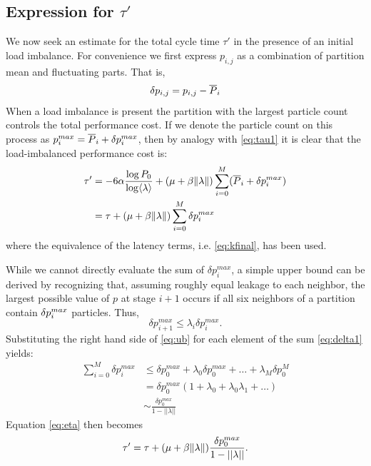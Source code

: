 \subsection{Expression for $\tau'$}

We now seek an estimate for the total cycle time $\tau'$ in the presence of an
initial load imbalance.  For convenience we first express $p_{i,j}$ as a
combination of partition mean and fluctuating parts. That is,
\begin{equation}
  \label{eq:mean}
  \delta{p_{i,j}} = p_{i,j} - \overline{P}_i
\end{equation}
When a load imbalance is present the partition with the largest particle count
controls the total performance cost.  If we denote the particle count on this
process as $p^{max}_i = \overline{P}_i + \delta{p_i^{max}}$, then by analogy with
\eqref{eq:tau1} it is clear that the load-imbalanced performance cost is:
\begin{align}
  \label{eq:eta}
  \tau' &= -6 \alpha \frac{\log P_0}{\log \langle \lambda \rangle} + (\mu + \beta \| \lambda \|)
  \sum_{i=0}^{M} (\overline{P}_i + \delta{p_i^{max}}) \\
  &= \tau + (\mu + \beta \| \lambda \|) \sum_{i=0}^{M}\delta{p_i^{max}}
\end{align}
where the equivalence of the latency terms, i.e. \eqref{eq:kfinal}, has been
used.

While we cannot directly evaluate the sum of $\delta p_i^{max}$, a simple upper
bound can be derived by recognizing that, assuming roughly equal leakage to each
neighbor, the largest possible value of $p$ at stage $i+1$ occurs if all six
neighbors of a partition contain $\delta{p_i^{max}}$ particles. Thus,
\begin{equation}
  \label{eq:ub}
  \delta p^{max}_{i+1} \le \lambda_i \delta p^{max}_i.
\end{equation}
Substituting the right hand side of \eqref{eq:ub} for each element of the sum
\eqref{eq:delta1} yields:
\begin{align*}
  \sum_{i=0}^M \delta p_i^{max} &\le \delta p_0^{max} + \lambda_0\delta
  p_0^{max} + \dots + \lambda_M\delta p_0^M  \\
  &= \delta p_0^{max}(1 + \lambda_0 + \lambda_0\lambda_1 + \dots) \\
  &\sim \frac{\delta p_0^{max}}{1-||\lambda||}
\end{align*}
Equation \eqref{eq:eta} then becomes
\begin{equation}
  \label{eq:tauprime}
  \tau' = \tau + (\mu + \beta \| \lambda \|) \frac{\delta p_0^{max}}{1 - ||\lambda||}.
\end{equation}

